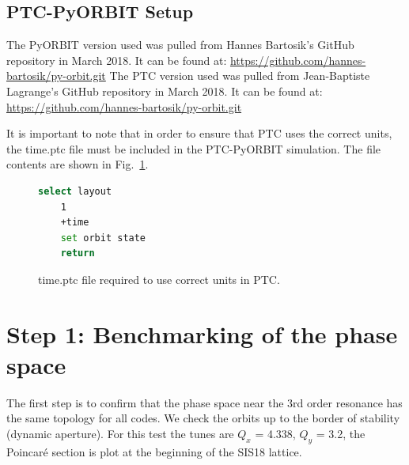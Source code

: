 \documentclass[a4paper]{cernatsnote}
\def \hbgithub {\href{https://github.com/hannes-bartosik/py-orbit}{https://github.com/hannes-bartosik/py-orbit.git}}
\begin{document}
\subsection{PTC-PyORBIT Setup}

The PyORBIT version used was pulled from Hannes Bartosik's GitHub repository in March 2018. It can be found at: \hbgithub 
The PTC version used was pulled from Jean-Baptiste Lagrange's GitHub repository in March 2018. It can be found at: \hbgithub 

It is important to note that in order to ensure that PTC uses the correct units, the time.ptc file must be included in the PTC-PyORBIT simulation. The file contents are shown in Fig.~\ref{fig:ptc_time}.

\begin{figure}
	\begin{lstlisting}[language=bash, belowskip=-3\medskipamount]
	select layout
	1
	+time
	set orbit state
	return
	\end{lstlisting}
	\caption{time.ptc file required to use correct units in PTC.}
	\label{fig:ptc_time}
\end{figure}



\newpage

\section{Step 1: Benchmarking of the phase space}

The first step is to confirm that the phase space near the 3rd order resonance has the same topology for all codes. We check the orbits up to the border of stability (dynamic aperture). For this test the tunes are $Q_x$ = 4.338, $Q_y$ = 3.2, the Poincar\'{e} section is plot at the beginning of the SIS18 lattice. 
\end{document}
